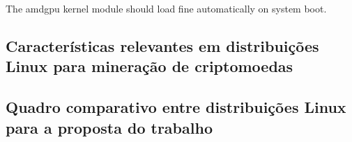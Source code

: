 \documentclass[
	article,			%
	12pt,				%
	openright,			%
	oneside,			%
	a4paper,			%
	chapter=TITLE,		%
	section=TITLE,		%
	subsection=TITLE,	%
	subsubsection=TITLE,%
	subsubsubsection=TITLE, %
	english,			%
	brazil,				%
	]{abntex2}
\begin{document}
The amdgpu kernel module should load fine automatically on system boot. 

\cite{ArchWiki2018e}

\subsection{Características relevantes em distribuições Linux para mineração de criptomoedas}

\subsection{Quadro comparativo entre distribuições Linux para a proposta do trabalho}









%
%


\end{document}
